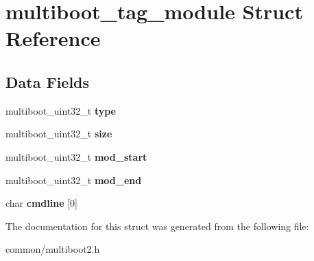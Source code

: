 \hypertarget{structmultiboot__tag__module}{}\section{multiboot\+\_\+tag\+\_\+module Struct Reference}
\label{structmultiboot__tag__module}
\subsection*{Data Fields}
\begin{DoxyCompactItemize}
\item 
multiboot\+\_\+uint32\+\_\+t {\bfseries type}\hypertarget{structmultiboot__tag__module_a105a58eef8f4c2a848375c6808eefa42}{}\label{structmultiboot__tag__module_a105a58eef8f4c2a848375c6808eefa42}

\item 
multiboot\+\_\+uint32\+\_\+t {\bfseries size}\hypertarget{structmultiboot__tag__module_a11e246a75cfb2a98a79568f29236c1fa}{}\label{structmultiboot__tag__module_a11e246a75cfb2a98a79568f29236c1fa}

\item 
multiboot\+\_\+uint32\+\_\+t {\bfseries mod\+\_\+start}\hypertarget{structmultiboot__tag__module_af2870ead515a1c38d4484645ab54fb03}{}\label{structmultiboot__tag__module_af2870ead515a1c38d4484645ab54fb03}

\item 
multiboot\+\_\+uint32\+\_\+t {\bfseries mod\+\_\+end}\hypertarget{structmultiboot__tag__module_ae0a4f42952619e0807cbb5debbf6e5af}{}\label{structmultiboot__tag__module_ae0a4f42952619e0807cbb5debbf6e5af}

\item 
char {\bfseries cmdline} \mbox{[}0\mbox{]}\hypertarget{structmultiboot__tag__module_ae28133d78349211f87ff9fcfb9ab3056}{}\label{structmultiboot__tag__module_ae28133d78349211f87ff9fcfb9ab3056}

\end{DoxyCompactItemize}


The documentation for this struct was generated from the following file\+:\begin{DoxyCompactItemize}
\item 
common/multiboot2.\+h\end{DoxyCompactItemize}
